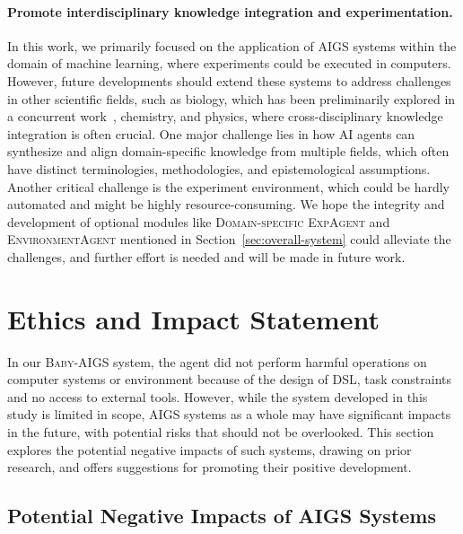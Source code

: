 \documentclass{article} %
\newcommand{\AIGS}{AIGS\xspace}
\newcommand{\AIGSSys}{\textsc{Baby-AIGS}\xspace}
\newcommand{\DSL}{\textsc{DSL}\xspace}
\begin{document}
\paragraph{Promote interdisciplinary knowledge integration and experimentation.}
In this work, we primarily focused on the application of \AIGS systems within the domain of machine learning, where experiments could be executed in computers. 
However, future developments should extend these systems to address challenges in other scientific fields, such as biology, which has been preliminarily explored in a concurrent work~\citep{Swanson2024.11.11.623004}, chemistry, and physics, where cross-disciplinary knowledge integration is often crucial.
One major challenge lies in how AI agents can synthesize and align domain-specific knowledge from multiple fields, which often have distinct terminologies, methodologies, and epistemological assumptions. Another critical challenge is the experiment environment, which could be hardly automated and might be highly resource-consuming.  
We hope the integrity and development of optional modules like \textsc{Domain-specific ExpAgent} and \textsc{EnvironmentAgent} mentioned in Section~\ref{sec:overall-system} could alleviate the challenges, and further effort is needed and will be made in future work. 

\section{Ethics and Impact Statement}
\label{sec:ethicandimpact}

In our \AIGSSys system, the agent did not perform harmful operations on computer systems or environment because of the design of \DSL, task constraints and no access to external tools. 
However, while the system developed in this study is limited in scope, \AIGS systems as a whole may have significant impacts in the future, with potential risks that should not be overlooked.
This section explores the potential negative impacts of such systems, drawing on prior research, and offers suggestions for promoting their positive development.

\subsection{Potential Negative Impacts of \AIGS Systems}

\end{document}
